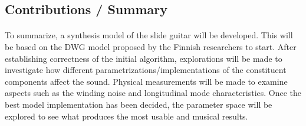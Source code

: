\documentclass[12pt]{article}
\begin{document}
\subsection*{Contributions / Summary}
\paragraph{}
To summarize, a synthesis model of the slide guitar will be developed. This will be based on the DWG model proposed by the Finnish researchers to start. After establishing correctness of the initial algorithm, explorations will be made to investigate how different parametrizations/implementations of the constituent components affect the sound. Physical measurements will be made to examine aspects such as the winding noise and longitudinal mode characteristics. Once the best model implementation has been decided, the parameter space will be explored to see what produces the most usable and musical results.

\clearpage


\end{document}
